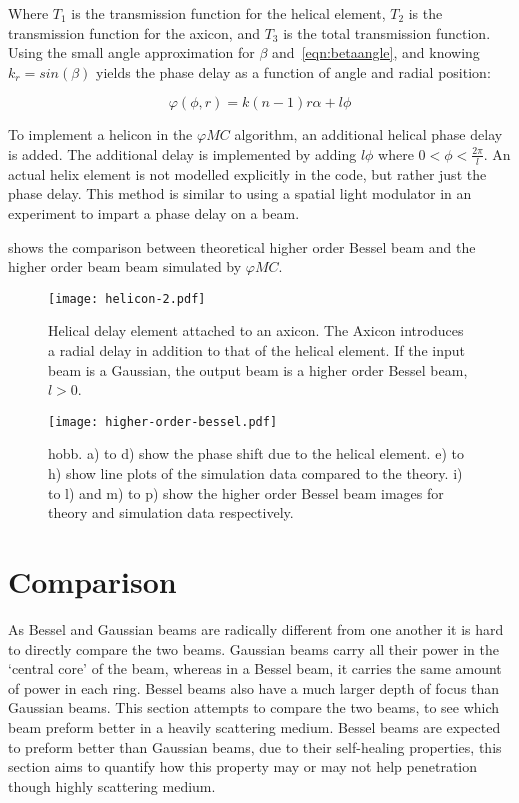 Where $T_1$ is the transmission function for the helical element, $T_2$ is the transmission function for the axicon, and $T_3$ is the total transmission function.
Using the small angle approximation  for $\beta$ and~\cref{eqn:betaangle}, and knowing $k_r=sin\left(\beta\right)$ yields the phase delay as a function of angle and radial position:

\begin{equation}
\varphi(\phi,r)=k(n-1)r\alpha+l\phi
\end{equation}

To implement a helicon in the $\varphi MC$ algorithm, an additional helical phase delay is added.
The additional delay is implemented by adding $l\phi$ where $0<\phi<\tfrac{2\pi}{l}$.
An actual helix element is not modelled explicitly in the code, but rather just the phase delay.
This method is similar to using a spatial light modulator in an experiment to impart a phase delay on a beam.

 shows the comparison between theoretical higher order Bessel beam and the higher order beam beam simulated by $\varphi MC$.

\begin{figure}[!ht]
    \centering
    \texttt{[image: helicon-2.pdf]}
    \caption{Helical delay element attached to an axicon. The Axicon introduces a radial delay in addition to that of the helical element. If the input beam is a Gaussian, the output beam is a higher order Bessel beam, $l>0$.}
    \label{fig:helix-2}
    \vspace{-10pt}
\end{figure}

\begin{figure}[!ht]
    \centering
    \texttt{[image: higher-order-bessel.pdf]}
    \caption{\Gls*{hobb}. a) to d) show the phase shift due to the helical element. e) to h) show line plots of the simulation data compared to the theory. i) to l) and m) to p) show the higher order Bessel beam images for theory and simulation data respectively.}
    \label{fig:highordershow}
\end{figure}

\FloatBarrier
\section{Comparison}
\label{sec:compBeams}
As Bessel and Gaussian beams are radically different from one another it is hard to directly compare the two beams.
Gaussian beams carry all their power in the `central core' of the beam, whereas in a Bessel beam, it carries the same amount of power in each ring.
Bessel beams also have a much larger depth of focus than Gaussian beams.
This section attempts to compare the two beams, to see which beam preform better in a heavily scattering medium.
Bessel beams are expected to preform better than Gaussian beams, due to their self-healing properties, this section aims to quantify how this property may or may not help penetration though highly scattering medium. 

